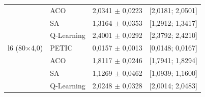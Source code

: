 \begin{table}[htb]
\begin{tabular}{llcc}
         & ACO & 2,0341 $\pm$ 0,0223 & [2,0181; 2,0501] \\
         & SA & 1,3164 $\pm$ 0,0353 & [1,2912; 1,3417] \\
         & Q-Learning & 2,4001 $\pm$ 0,0292 & [2,3792; 2,4210] \\
        \hline
        l6 (80$\times$4,0) & PETIC & 0,0157 $\pm$ 0,0013 & [0,0148; 0,0167] \\
         & ACO & 1,8117 $\pm$ 0,0246 & [1,7941; 1,8294] \\
         & SA & 1,1269 $\pm$ 0,0462 & [1,0939; 1,1600] \\
         & Q-Learning & 2,0248 $\pm$ 0,0328 & [2,0014; 2,0483] \\
        \hline
    \end{tabular}
\end{table}

